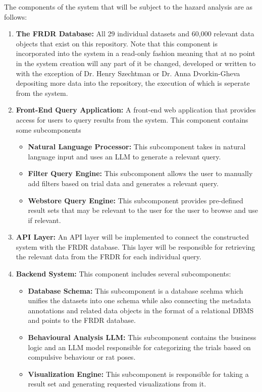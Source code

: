 \documentclass{article}
\begin{document}
\par{ The components of the system that will be subject to the hazard analysis are as follows:}

\begin{enumerate}
    \item \textbf{The FRDR Database:} All 29 individual datasets and 60,000 relevant data objects that exist on this repository. Note that this component is
    incorporated into the system in a read-only fashion meaning that at no point in the system creation will any part of it be changed, developed or written to
    with the exception of Dr. Henry Szechtman or Dr. Anna Dvorkin-Gheva depositing more data into the repository, the execution of which is seperate from the system.
    \item \textbf{Front-End Query Application:} A front-end web application that provides access for users to query results from the system. This component contains
    some subcomponents
        \begin{itemize}
            \item \textbf{Natural Language Processor:} This subcomponent takes in natural language input and uses an LLM to generate a relevant query.
            \item \textbf{Filter Query Engine:} This subcomponent allows the user to manually add filters based on trial data and generates a relevant query.
            \item \textbf{Webstore Query Engine:} This subcomponent provides pre-defined result sets that may be relevant to the user for the user to browse and
            use if relevant.
        \end{itemize}
    \item \textbf{API Layer:} An API layer will be implemented to connect the constructed system with the FRDR database. This layer will be responsible for 
    retrieving the relevant data from the FRDR for each individual query.
    \item \textbf{Backend System:} This component includes several subcomponents:
        \begin{itemize}
            \item \textbf{Database Schema:} This subcomponent is a database scehma which unifies the datasets into one schema while also connecting the metadata annotations
            and related data objects in the format of a relational DBMS and points to the FRDR database.
            \item \textbf{Behavioural Analysis LLM:} This subcomponent contains the business logic and an LLM model responsible for categorizing the trials
            based on compulsive behaviour or rat poses.
            \item \textbf{Visualization Engine:} This subcomponent is responsible for taking a result set and generating requested visualizations from it.
        \end{itemize}
\end{enumerate}
\end{document}
